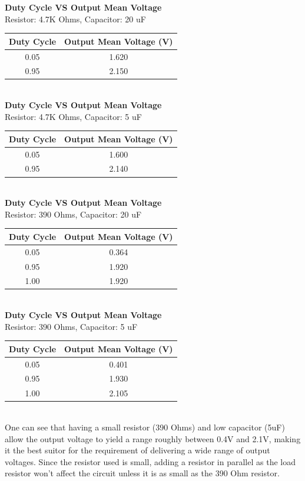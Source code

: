 \documentclass[12pt]{report}
\begin{document}
\textbf{Duty Cycle VS Output Mean Voltage}\\
	Resistor: 4.7K Ohms, Capacitor: 20 uF\\
	\begin{tabular}{|c|c|}
		\hline
		Duty Cycle & Output Mean Voltage (V)\\\hline
		0.05 & 1.620\\\hline
		0.95 & 2.150\\\hline
	\end{tabular}
	\newline
	\\
\textbf{Duty Cycle VS Output Mean Voltage}\\
	Resistor: 4.7K Ohms, Capacitor: 5 uF\\
	\begin{tabular}{|c|c|}
		\hline
		Duty Cycle & Output Mean Voltage (V)\\\hline
		0.05 & 1.600\\\hline
		0.95 & 2.140\\\hline
	\end{tabular}
	\newline
	\\
\textbf{Duty Cycle VS Output Mean Voltage}\\
	Resistor: 390 Ohms, Capacitor: 20 uF\\
	\begin{tabular}{|c|c|}
		\hline
		Duty Cycle & Output Mean Voltage (V)\\\hline
		0.05 & 0.364	\\\hline
		0.95 & 1.920\\\hline
		1.00 & 1.920\\\hline
	\end{tabular}
	\newline
	\\
\textbf{Duty Cycle VS Output Mean Voltage}\\
	Resistor: 390 Ohms, Capacitor: 5 uF\\
	\begin{tabular}{|c|c|}
		\hline
		Duty Cycle & Output Mean Voltage (V)\\\hline
		0.05 & 0.401	\\\hline
		0.95 & 1.930\\\hline
		1.00 & 2.105\\\hline
	\end{tabular}
	\newline
	\\
One can see that having a small resistor (390 Ohms) and low capacitor (5uF) allow the output voltage to yield a range roughly between 0.4V and 2.1V, making it the best suitor for the requirement of delivering a wide range of output voltages. Since the resistor used is small, adding a resistor in parallel as the load resistor won't affect the circuit unless it is as small as the 390 Ohm resistor.
\end{document}
